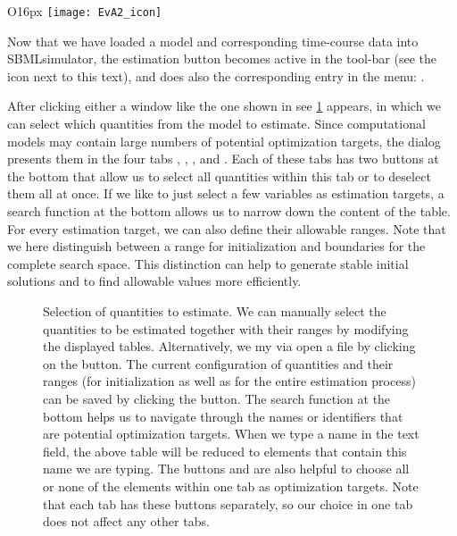 \begin{wrapfigure}{O}{16px}
\vspace{\wrapfigspace}
\texttt{[image: EvA2\_icon]}
\end{wrapfigure}
Now that we have loaded a model and corresponding time-course data into SBMLsimulator, the estimation button becomes active in the tool-bar (see the icon next to this text), and does also the corresponding entry in the menu: .

After clicking either a window like the one shown in see \cref{fig:quantitySelection} appears, in which we can select which quantities from the model to estimate.
Since computational models may contain large numbers of potential optimization targets, the dialog presents them in the four tabs , , , and .
Each of these tabs has two buttons at the bottom that allow us to select all quantities within this tab or to deselect them all at once.
If we like to just select a few variables as estimation targets, a search function at the bottom allows us to narrow down the content of the table.
For every estimation target, we can also define their allowable ranges.
Note that we here distinguish between a range for initialization and boundaries for the complete search space.
This distinction can help to generate stable initial solutions and to find allowable values more efficiently.
\begin{figure}[h]
\centering
{}
\caption[Selection of quantities to estimate]{Selection of quantities to estimate.
We can manually select the quantities to be estimated together with their ranges by modifying the displayed tables.
Alternatively, we my via open a \CSV file by clicking on the  button.
The current configuration of quantities and their ranges (for initialization as well as for the entire estimation process) can be saved by clicking the  button.
The search function at the bottom helps us to navigate through the names or identifiers that are potential optimization targets.
When we type a name in the text field, the above table will be reduced to elements that contain this name we are typing.
The buttons  and  are also helpful to choose all or none of the elements within one tab as optimization targets.
Note that each tab has these buttons separately, so our choice in one tab does not affect any other tabs.}
\label{fig:quantitySelection}
\end{figure}

